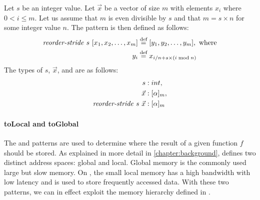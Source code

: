 \begin{definition}
  \label{definition:pattern:reorderStride}
  Let $s$ be an integer value.
  Let $\vec{x}$ be a vector of size $m$ with elements $x_i$ where $0 < i \leq m$.
  Let us assume that $m$ is even divisible by $s$ and that $m = s\times n$ for some integer value $n$.
  The \reorderStride pattern is then defined as follows:
  \begin{align*}
    \text{\textit{reorder-stride}}\ s\ [x_1, x_2, \dots, x_m] &\stackrel{\textrm{\scriptsize def}}{=} [y_1, y_2, \dots, y_m], \text{ where}\\
    y_i &\stackrel{\textrm{\scriptsize def}}{=} x_{i / n + s \times (i \bmod{n})}
  \end{align*}
  The types of $s$, $\vec{x}$, and \reorderStride are as follows:
  \begin{align*}
    s &: int,\\
    \vec{x} &: [\alpha]_m,\\
    \text{\textit{reorder-stride}}\ s\ \vec{x} &: [\alpha]_m
  \end{align*}
\end{definition}

{}


\paragraph{toLocal and toGlobal}
The \toLocal and \toGlobal patterns are used to determine where the result of a given function $f$ should be stored.
As explained in more detail in \autoref{chapter:background}, \OpenCL defines two distinct address spaces: global and local.
Global memory is the commonly used large but slow memory.
On \GPUs, the small local memory has a high bandwidth with low latency and is used to store frequently accessed data.
With these two patterns, we can in effect exploit the memory hierarchy defined in \OpenCL.

